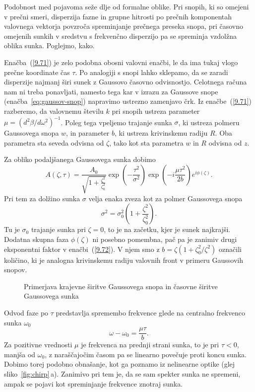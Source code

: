 Podobnost med pojavoma seže dlje od formalne oblike. Pri snopih, ki so omejeni 
v prečni smeri, disperzija fazne in grupne hitrosti po prečnih komponentah valovnega
vektorja povzroča spreminjanje prečnega preseka snopa, pri časovno
omejenih sunkih v sredstvu s frekvenčno disperzijo pa se spreminja
vzdolžna oblika sunka. Poglejmo, kako.

Enačba~(\ref{9.71}) je zelo podobna obosni valovni enačbi, le da ima tukaj vlogo 
prečne koordinate čas $\tau$. Po analogiji s snopi lahko sklepamo, da se zaradi
disperzije najmanj širi sunek z Gaussovo časovno odvisnostjo. Celotnega računa
nam ni treba ponavljati, namesto tega kar v izrazu za Gaussove snope 
(enačba~\ref{eq:gaussov-snop}) napravimo ustrezno zamenjavo črk. 
Iz enačbe~(\ref{9.71}) razberemo, da valovnemu številu $k$ pri snopih  
ustreza parameter $\mu=(d^{2}\beta/d\omega^{2})^{-1}$. Poleg tega vpeljemo
trajanje sunka $\sigma$, ki ustreza polmeru Gaussovega snopa $w$, in parameter
$b$, ki ustreza krivinskemu radiju $R$. Oba parametra sta seveda odvisna od $\zeta$, 
tako kot sta parametra $w$ in $R$ odvisna od $z$. 

Za obliko podaljšanega Gaussovega sunka dobimo 
\begin{equation}
A\left(\zeta,\tau\right)=\frac{A_{0}}{\sqrt{1+\frac{\zeta^{2}
}{\zeta_{0}^{2}}}}\exp\left(-\frac{\tau^{2}}{\sigma^{2}}\right)\exp
\left(-i\frac{\mu\tau^{2}}{2b}\right)e^{i\phi\left(\zeta\right)}.
\label{9.72}
\end{equation}
Pri tem za dolžino sunka $\sigma$ velja enaka zveza kot za polmer Gaussovega snopa
\begin{equation}
\sigma^{2}=\sigma_{0}^{2}\left(1+\frac{\zeta^{2}}{\zeta_{0}^{2}}\right).
\label{9.73}
\end{equation}
Tu je $\sigma_{0}$ trajanje sunka pri $\zeta=0$, to je na začetku,
kjer je sunek najkrajši. Dodatna skupna faza $\phi\left(\zeta\right)$
ni posebno pomembna, pač pa je zanimiv drugi eksponentni faktor v
enačbi~(\ref{9.72}). V njem smo z $b=\zeta\left(1+\zeta_{0}^{2}/\zeta^{2}\right)$
označili količino, ki je analogna krivinskemu radiju valovnih front
v primeru Gaussovih snopov. 
\begin{figure}[h]
\centering
\def\svgwidth{120truemm} 

\caption{Primerjava krajevne širitve Gaussovega snopa in časovne širitve Gaussovega sunka}
\label{fig:Gausstau}
\end{figure}

Odvod faze po $\tau$ predstavlja spremembo
frekvence glede na centralno frekvenco sunka $\omega_{0}$
\begin{equation}
\omega-\omega_{0}=\frac{\mu\tau}{b}.
\label{9.74}
\end{equation}
Za pozitivne vrednosti $\mu$ je frekvenca na prednji strani sunka,
to je pri $\tau<0$, manjša od $\omega_0$, z naraščajočim časom pa se 
linearno povečuje proti koncu sunka.
Dobimo torej podobno obnašanje, kot ga poznamo iz nelinearne optike
(glej sliko~\ref{fig:chirp}\,a). Zanimivo pri tem je, da se sam spekter
sunka ne spremeni, ampak se pojavi kot spreminjanje frekvence znotraj sunka.

